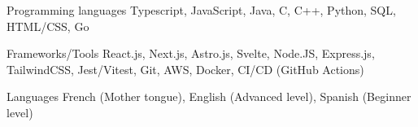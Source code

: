 
\begin{cvskills}
  \cvskill
    {Programming languages} %
    {Typescript, JavaScript, Java, C, C++, Python, SQL, HTML/CSS, Go} %

  \cvskill
    {Frameworks/Tools} %
    {React.js, Next.js, Astro.js, Svelte, Node.JS, Express.js, TailwindCSS, Jest/Vitest, Git, AWS, Docker, CI/CD (GitHub Actions)} %
    
  \cvskill
    {Languages} %
    {French (Mother tongue), English (Advanced level), Spanish (Beginner level)} %
    
\end{cvskills}
